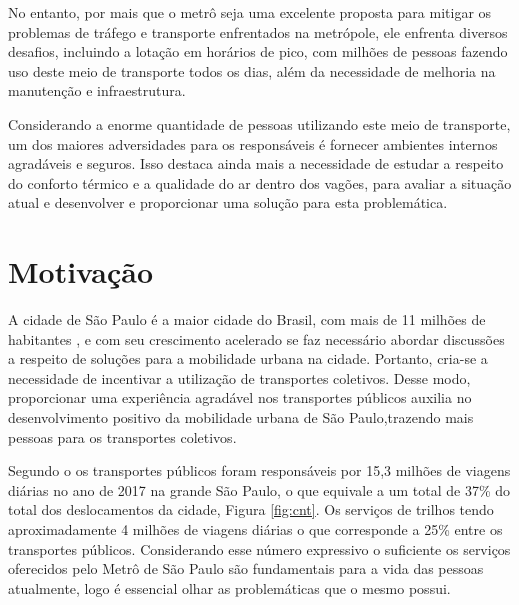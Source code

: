 \documentclass[acronym,symbols,table]{fei}
\begin{document}
No entanto, por mais que o metrô seja uma excelente proposta para mitigar os problemas de tráfego e transporte enfrentados na metrópole, ele enfrenta diversos desafios, incluindo a lotação em horários de pico, com milhões de pessoas fazendo uso deste meio de transporte todos os dias, além da necessidade de melhoria na manutenção e infraestrutura.

Considerando a enorme quantidade de pessoas utilizando este meio de transporte, um dos maiores adversidades para os responsáveis é fornecer ambientes internos agradáveis e seguros. Isso destaca ainda mais a necessidade de estudar a respeito do conforto térmico e a qualidade do ar dentro dos vagões, para avaliar a situação atual e desenvolver e proporcionar uma solução para esta problemática.

\section{Motivação}

A cidade de São Paulo é a maior cidade do Brasil, com mais de 11 milhões de habitantes \cite{IBGE},  e com seu crescimento acelerado se faz necessário abordar discussões a respeito de soluções para a mobilidade urbana na cidade. Portanto, cria-se a necessidade de incentivar a utilização de transportes coletivos. Desse modo, proporcionar uma experiência agradável nos transportes públicos auxilia no desenvolvimento positivo da mobilidade urbana de São Paulo,trazendo mais pessoas para os transportes coletivos.

Segundo o \textcite{cnt} os transportes públicos foram responsáveis por 15,3 milhões de viagens diárias no ano de 2017 na grande São Paulo, o que equivale a um total de 37\% do total dos deslocamentos da cidade, Figura \ref{fig:cnt}. Os serviços de trilhos tendo aproximadamente 4 milhões de viagens diárias o que corresponde a 25\% entre os transportes públicos. Considerando esse número expressivo o suficiente os serviços oferecidos pelo Metrô de São Paulo são fundamentais para a vida das pessoas atualmente, logo é essencial olhar as problemáticas que o mesmo possui.
\end{document}

